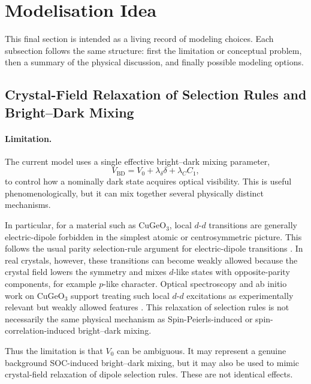 \documentclass[11pt]{article}
\begin{document}
\section{Modelisation Idea}

This final section is intended as a living record of modeling choices. Each subsection follows the same structure: first the limitation or conceptual problem, then a summary of the physical discussion, and finally possible modeling options.

\subsection{Crystal-Field Relaxation of Selection Rules and Bright--Dark Mixing}

\paragraph{Limitation.}

The current model uses a single effective bright--dark mixing parameter,
\begin{equation}
V_{\mathrm{BD}}
=
V_0+\lambda_\delta\delta+\lambda_C C_1,
\end{equation}
to control how a nominally dark state acquires optical visibility. This is useful phenomenologically, but it can mix together several physically distinct mechanisms.

In particular, for a material such as CuGeO\(_3\), local \(d\)-\(d\) transitions are generally electric-dipole forbidden in the simplest atomic or centrosymmetric picture. This follows the usual parity selection-rule argument for electric-dipole transitions \cite{LaporteMeggers1925}. In real crystals, however, these transitions can become weakly allowed because the crystal field lowers the symmetry and mixes \(d\)-like states with opposite-parity components, for example \(p\)-like character. Optical spectroscopy and ab initio work on CuGeO\(_3\) support treating such local \(d\)-\(d\) excitations as experimentally relevant but weakly allowed features \cite{Damascelli2000,Huang2011}. This relaxation of selection rules is not necessarily the same physical mechanism as Spin-Peierls-induced or spin-correlation-induced bright--dark mixing.

Thus the limitation is that \(V_0\) can be ambiguous. It may represent a genuine background SOC-induced bright--dark mixing, but it may also be used to mimic crystal-field relaxation of dipole selection rules. These are not identical effects.
\end{document}
